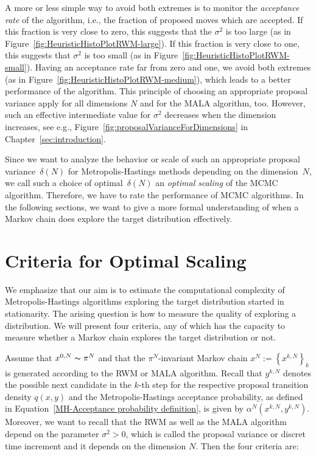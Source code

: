 A more or less simple way to avoid both extremes is to monitor the \textit{acceptance rate} of the algorithm, i.e., the fraction of proposed moves which are accepted. If this fraction is very close to zero, this suggests that the $ \sigma^2 $ is too large (as in Figure~\ref{fig:HeuristicHistoPlotRWM-large}). If this fraction is very close to one, this suggests that $ \sigma^2 $ is too small (as in Figure~\ref{fig:HeuristicHistoPlotRWM-small}). Having an acceptance rate far from zero and one, we avoid both extremes (as in Figure~\ref{fig:HeuristicHistoPlotRWM-medium}), which leads to a better performance of the algorithm. This principle of choosing an appropriate proposal variance apply for all dimensions $N$ and for the MALA algorithm, too. However, such an effective intermediate value for $\sigma^2$ decreases when the dimension increases, see e.g., Figure~\ref{fig:proposalVarianceForDimensions} in Chapter~\ref{sec:introduction}. 


Since we want to analyze the behavior or scale of such an appropriate proposal variance~$\delta(N)$ for Metropolis-Hastings methods depending on the dimension~$N$, we call such a choice of optimal~$\delta(N)$ an \textit{optimal scaling} of the MCMC algorithm. Therefore, we have to rate the performance of MCMC algorithms. In the following sections, we want to give a more formal understanding of when  a Markov chain does explore the target distribution effectively.





\section{Criteria for Optimal Scaling}
\label{CC:Criteria}

We emphasize that our aim is to estimate the computational complexity of Metropolis-Hastings algorithms exploring the target distribution started in stationarity. The arising question is how to measure the quality of exploring a distribution. We will present four criteria, any of which has the capacity to measure whether a Markov chain explores the target distribution or not. 

Assume that $ x^{0,N}  \thicksim \pi^{N} $ and that the $\pi^{N}$-invariant Markov chain $ x^{N} := \left\{ x^{k,N}\right\}_k $ is generated according to the RWM or MALA algorithm. Recall that $ y^{k,N} $ denotes the possible next candidate in the $k$-th step for the respective proposal transition density $ q(x,y) $ and the Metropolis-Hastings acceptance probability, as defined in Equation~\ref{MH-Acceptance probability definition}, is given by $ \alpha^{N}\left(x^{k,N},y^{k,N}\right) $. Moreover, we want to recall that the RWM as well as the MALA algorithm depend on the parameter $ \sigma^2 > 0 $, which is called the proposal variance or discret time increment and it depends on the dimension $N$. Then the four criteria are:

